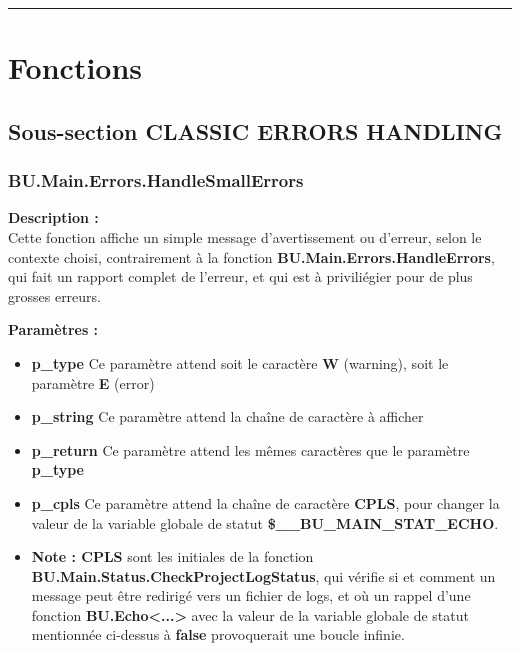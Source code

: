 \documentclass[a4paper,10pt]{article}
\begin{document}
\color{sec1}\par\noindent\rule{\textwidth}{0.4pt}\color{text}

\color{sec1}
\section{Fonctions}\color{text}

\color{sec2}
\subsection{Sous-section CLASSIC ERRORS HANDLING}\color{text}

\color{sec3}
\subsubsection{BU.Main.Errors.HandleSmallErrors}\color{text}

\begin{justify}
    \textbf{Description :}\\
    Cette fonction affiche un simple message d'avertissement ou d'erreur, selon le contexte choisi, contrairement à la fonction \textbf{\color{mauve}BU.Main.Errors.HandleErrors}, qui fait un rapport complet de l'erreur, et qui est à priviliégier pour de plus grosses erreurs.
\end{justify}

\begin{justify}
    \textbf{Paramètres :}

    \begin{itemize}
        \item \textbf{\color{vars}p\_type} Ce paramètre attend soit le caractère \textbf{W} (warning), soit le paramètre \textbf{E} (error)\\\mbox{}

        \item \textbf{\color{vars}p\_string} Ce paramètre attend la chaîne de caractère à afficher\\\mbox{}

        \item \textbf{\color{vars}p\_return} Ce paramètre attend les mêmes caractères que le paramètre \textbf{\color{vars}p\_type}\\\mbox{}

        \item \textbf{\color{vars}p\_cpls} Ce paramètre attend la chaîne de caractère \textbf{CPLS}, pour changer la valeur de la variable globale de statut \textbf{\color{vars}\$\_\_BU\_MAIN\_STAT\_ECHO}.\\\mbox{}

        \item \textbf{Note : CPLS} sont les initiales de la fonction \textbf{\color{mauve}BU.Main.Status.CheckProjectLogStatus}, qui vérifie si et comment un message peut être redirigé vers un fichier de logs, et où un rappel d'une fonction \textbf{\color{mauve}BU.Echo<...>} avec la valeur de la variable globale de statut mentionnée ci-dessus à \textbf{false} provoquerait une boucle infinie.
    \end{itemize}
\end{justify}
\end{document}
